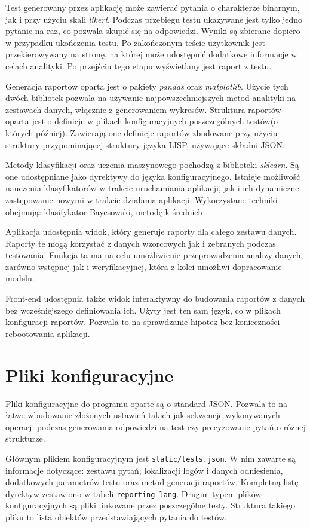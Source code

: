 \documentclass[12pt,a4paper,oneside]{report} %
\begin{document}
Test generowany przez aplikację może zawierać pytania o charakterze binarnym, jak i przy użyciu skali \emph{likert}. Podczas przebiegu testu ukazywane jest tylko jedno pytanie na raz, co pozwala skupić się na odpowiedzi. Wyniki są zbierane dopiero w przypadku ukończenia testu. Po zakończonym teście użytkownik jest przekierowywany na stronę, na której może udostępnić dodatkowe informacje w celach analityki. Po przejściu tego etapu wyświetlany jest raport z testu.

Generacja raportów oparta jest o pakiety \emph{pandas} oraz \emph{matplotlib}. Użycie tych dwóch bibliotek pozwala na używanie najpowszechniejszych metod analityki na zestawach danych, włącznie z generowaniem wykresów. Struktura raportów oparta jest o definicje w plikach konfiguracyjnych poszczególnych testów(o których później). Zawierają one definicje raportów zbudowane przy użyciu struktury przypominającej struktury języka LISP, używające składni JSON.

Metody klasyfikacji oraz uczenia maszynowego pochodzą z biblioteki \emph{sklearn}. Są one udostępniane jako dyrektywy do języka konfiguracyjnego. Istnieje możliwość nauczenia klasyfikatorów w trakcie uruchamiania aplikacji, jak i ich dynamiczne zastępowanie nowymi w trakcie działania aplikacji. Wykorzystane techniki obejmują: klasifykator Bayesowski, metodę k-średnich

Aplikacja udostępnia widok, który generuje raporty dla całego zestawu danych. Raporty te mogą korzystać z danych wzorcowych jak i zebranych podczas testowania. Funkcja ta ma na celu umożliwienie przeprowadzenia analizy danych, zarówno wstępnej jak i weryfikacyjnej, która z kolei umożliwi dopracowanie modelu.

Front-end udostępnia także widok interaktywny do budowania raportów z danych bez wcześniejszego definiowania ich. Użyty jest ten sam język, co w plikach konfiguracji raportów. Pozwala to na sprawdzanie hipotez bez konieczności rebootowania aplikacji.

\section{Pliki konfiguracyjne}

Pliki konfiguracyjne do programu oparte są o standard JSON. Pozwala to na łatwe wbudowanie złożonych ustawień takich jak sekwencje wykonywanych operacji podczas generowania odpowiedzi na test czy precyzowanie pytań o różnej strukturze.

Głównym plikiem konfiguracyjnym jest \texttt{static/tests.json}. W nim zawarte są informacje dotyczące: zestawu pytań, lokalizacji logów i danych odniesienia, dodatkowych parametrów testu oraz metod generacji raportów. Kompletną listę dyrektyw zestawiono w tabeli \texttt{reporting-lang}. Drugim typem plików konfiguracyjnych są pliki linkowane przez poszczególne testy. Struktura takiego pliku to lista obiektów przedstawiających pytania do testów.
\end{document}
